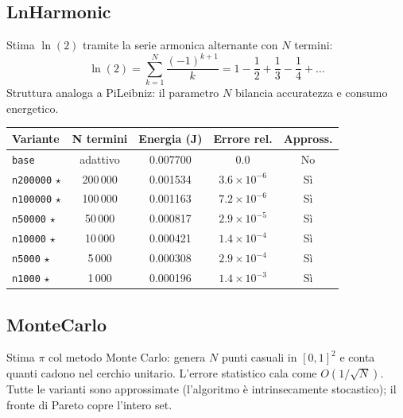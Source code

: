 \documentclass[a4paper,11pt]{article}
\begin{document}
\subsection{LnHarmonic}

Stima $\ln(2)$ tramite la serie armonica alternante con $N$ termini:
\[
  \ln(2) = \sum_{k=1}^{N} \frac{(-1)^{k+1}}{k}
         = 1 - \frac{1}{2} + \frac{1}{3} - \frac{1}{4} + \ldots
\]
Struttura analoga a PiLeibniz: il parametro $N$ bilancia accuratezza e consumo
energetico.

\begin{table}[h!]
\centering
\small
\begin{tabular}{lcccc}
\toprule
\textbf{Variante} & \textbf{N termini} & \textbf{Energia (J)} &
\textbf{Errore rel.} & \textbf{Appross.} \\
\midrule
\texttt{base}          & adattivo & 0.007700 & $0.0$              & No \\
\texttt{n200000} $\star$ & 200\,000 & 0.001534 & $3.6\times10^{-6}$ & Sì \\
\texttt{n100000} $\star$ & 100\,000 & 0.001163 & $7.2\times10^{-6}$ & Sì \\
\texttt{n50000}  $\star$ &  50\,000 & 0.000817 & $2.9\times10^{-5}$ & Sì \\
\texttt{n10000}  $\star$ &  10\,000 & 0.000421 & $1.4\times10^{-4}$ & Sì \\
\texttt{n5000}   $\star$ &   5\,000 & 0.000308 & $2.9\times10^{-4}$ & Sì \\
\texttt{n1000}   $\star$ &   1\,000 & 0.000196 & $1.4\times10^{-3}$ & Sì \\
\bottomrule
\end{tabular}
\end{table}

\subsection{MonteCarlo}

Stima $\pi$ col metodo Monte Carlo: genera $N$ punti casuali in $[0,1]^2$ e conta
quanti cadono nel cerchio unitario. L'errore statistico cala come $O(1/\sqrt{N})$.
Tutte le varianti sono approssimate (l'algoritmo è intrinsecamente stocastico); il
fronte di Pareto copre l'intero set.
\end{document}
